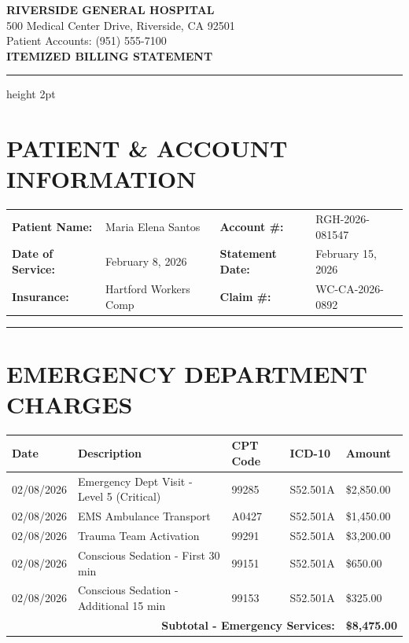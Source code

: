 \documentclass[11pt]{article}
\begin{document}
\begin{center}
{\Large\bfseries\color{medblue} RIVERSIDE GENERAL HOSPITAL}\\[0.3em]
{\small 500 Medical Center Drive, Riverside, CA 92501}\\
{\small Patient Accounts: (951) 555-7100}\\[1em]
{\LARGE\bfseries ITEMIZED BILLING STATEMENT}
\end{center}

\vspace{0.5em}
\hrule height 2pt
\vspace{1em}

\section*{PATIENT \& ACCOUNT INFORMATION}

\begin{tabular}{@{}p{4cm}p{5cm}p{3.5cm}p{4cm}@{}}
\textbf{Patient Name:} & Maria Elena Santos & \textbf{Account \#:} & RGH-2026-081547 \\
\textbf{Date of Service:} & February 8, 2026 & \textbf{Statement Date:} & February 15, 2026 \\
\textbf{Insurance:} & Hartford Workers Comp & \textbf{Claim \#:} & WC-CA-2026-0892 \\
\end{tabular}

\vspace{1em}
\hrule
\vspace{1em}

\section*{EMERGENCY DEPARTMENT CHARGES}

\begin{longtable}{@{}p{2cm}p{6cm}p{2cm}p{2cm}p{2.5cm}@{}}
\toprule
\textbf{Date} & \textbf{Description} & \textbf{CPT Code} & \textbf{ICD-10} & \textbf{Amount} \\
\midrule
\endhead

02/08/2026 & Emergency Dept Visit - Level 5 (Critical) & 99285 & S52.501A & \$2,850.00 \\
02/08/2026 & EMS Ambulance Transport & A0427 & S52.501A & \$1,450.00 \\
02/08/2026 & Trauma Team Activation & 99291 & S52.501A & \$3,200.00 \\
02/08/2026 & Conscious Sedation - First 30 min & 99151 & S52.501A & \$650.00 \\
02/08/2026 & Conscious Sedation - Additional 15 min & 99153 & S52.501A & \$325.00 \\
\midrule
\multicolumn{4}{r}{\textbf{Subtotal - Emergency Services:}} & \textbf{\$8,475.00} \\
\bottomrule
\end{longtable}
\end{document}
